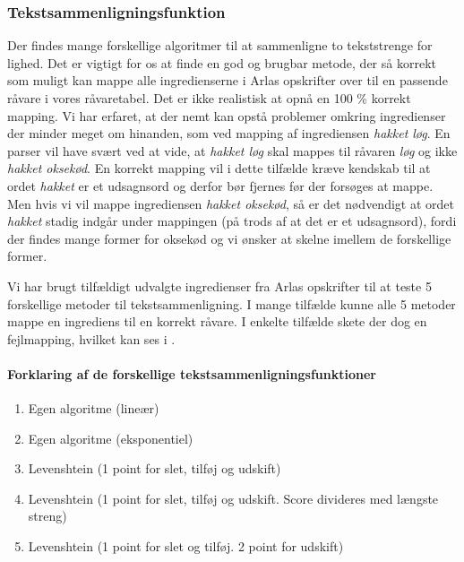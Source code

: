 \subsubsection{Tekstsammenligningsfunktion}
Der findes mange forskellige algoritmer til at sammenligne to tekststrenge for lighed. Det er vigtigt for os at finde en god og brugbar metode, der så korrekt som muligt kan mappe alle ingredienserne i Arlas opskrifter over til en passende råvare i vores råvaretabel. Det er ikke realistisk at opnå en 100 \% korrekt mapping. Vi har erfaret, at der nemt kan opstå problemer omkring ingredienser der minder meget om hinanden, som \fx ved mapping af ingrediensen \textit{hakket løg}. En parser vil have svært ved at vide, at \textit{hakket løg} skal mappes til råvaren \textit{løg} og ikke \textit{hakket oksekød}. En korrekt mapping vil i dette tilfælde kræve kendskab til at ordet \textit{hakket} er et udsagnsord og derfor bør fjernes før der forsøges at mappe. Men hvis vi vil mappe ingrediensen \textit{hakket oksekød}, så er det nødvendigt at ordet \textit{hakket} stadig indgår under mappingen (på trods af at det er et udsagnsord), fordi der findes mange former for oksekød og vi ønsker at skelne imellem de forskellige former.

Vi har brugt tilfældigt udvalgte ingredienser fra Arlas opskrifter til at teste 5 forskellige metoder til tekstsammenligning. I mange tilfælde kunne alle 5 metoder mappe en ingrediens til en korrekt råvare. I enkelte tilfælde skete der dog en fejlmapping, hvilket kan ses i .

\paragraph{Forklaring af de forskellige tekstsammenligningsfunktioner}
\begin{enumerate}
\item Egen algoritme (lineær)
\item Egen algoritme (eksponentiel)
\item Levenshtein (1 point for slet, tilføj og udskift) %
\item Levenshtein (1 point for slet, tilføj og udskift. Score divideres med længste streng) %
\item Levenshtein (1 point for slet og tilføj. 2 point for udskift) %
\end{enumerate}


